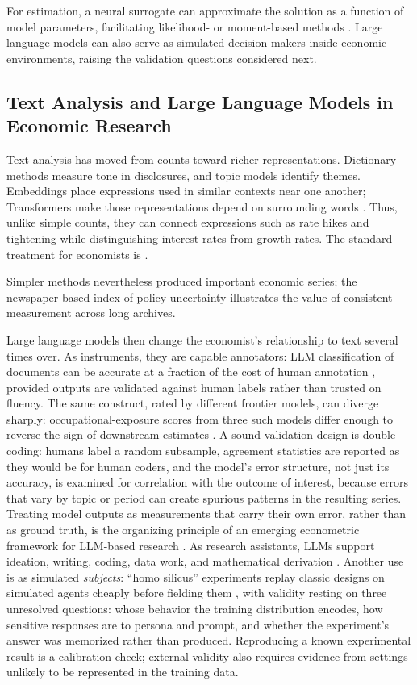 \documentclass[12pt]{article}
\theoremstyle{plain}
\theoremstyle{definition}
\theoremstyle{remark}
\begin{document}
For estimation, a neural surrogate can approximate the solution as a
function of model parameters, facilitating likelihood- or moment-based
methods \citep{FernandezVillaverdeEtAl2024}. Large language models can
also serve as simulated decision-makers inside economic environments,
raising the validation questions considered next.

\subsection{Text Analysis and Large Language Models in Economic Research}\label{subsec:text-llm}

Text analysis has moved from counts toward richer representations.
Dictionary methods measure tone in disclosures, and topic models
identify themes. Embeddings place expressions used in similar
contexts near one another; Transformers make those representations
depend on surrounding words \citep{Vaswani2017}. Thus, unlike simple
counts, they can connect expressions such as rate hikes and tightening
while distinguishing interest rates from growth rates. The standard
treatment for economists is \citet{GentzkowKellyTaddy2019}.

Simpler methods nevertheless produced important economic series; the
newspaper-based index of policy uncertainty \citep{BakerBloomDavis2016}
illustrates the value of consistent measurement across long archives.

Large language models then change the economist's relationship to text
several times over. As instruments, they are capable annotators: LLM
classification of documents can be accurate at a fraction of the cost
of human annotation \citep{Dell2025}, provided outputs
are validated against human
labels rather than trusted on fluency. The same construct, rated by
different frontier models, can diverge sharply: occupational-exposure
scores from three such models differ enough to reverse the sign of
downstream estimates \citep{YinVuPersico2026}. A sound validation
design is double-coding: humans
label a random subsample, agreement statistics are reported as they
would be for human coders, and the model's error structure, not just
its accuracy, is examined for correlation with the outcome of interest,
because errors that vary by topic or period can create spurious
patterns in the resulting series. Treating
model outputs as measurements that carry their own error, rather than
as ground truth, is the organizing principle of an emerging econometric
framework for LLM-based research \citep{LudwigMullainathan2025}. As
research assistants, LLMs support ideation, writing, coding, data
work, and mathematical derivation \citep{Korinek2023}. Another use is as simulated
\emph{subjects}: ``homo silicus'' experiments replay classic designs on
simulated agents cheaply before fielding them \citep{Horton2023}, with
validity resting on three unresolved questions: whose behavior the
training distribution encodes, how sensitive responses are to persona
and prompt, and whether the experiment's answer was memorized rather
than produced. Reproducing a known experimental result is a calibration check;
external validity also requires evidence from settings unlikely to be
represented in the training data.
\end{document}
